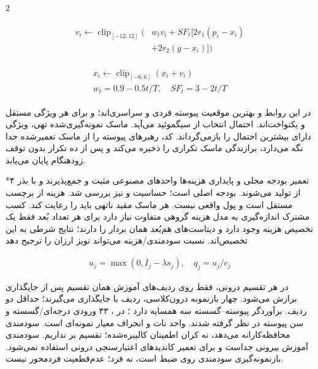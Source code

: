 \documentclass[10pt,a4paper]{article}
\makeatletter
\renewcommand{\section}{\@startsection{section}{1}{0pt}{5pt}{2pt}{\normalfont\normalsize\bfseries}}
\newcommand{\sect}[1]{\section*{#1}}
\makeatother
\begin{document}
\begin{multicols}{2}
\begin{latin}\begin{equation}\begin{gathered}\begin{aligned}v_i\leftarrow\operatorname{clip}_{[-12,12]}\big(&w_t v_i+SF_t[2r_1(p_i-x_i)\\&+2r_2(g-x_i)]\big)\end{aligned}\end{gathered}\end{equation}\end{latin}
\begin{latin}\begin{equation}\begin{gathered}\begin{gathered}x_i\leftarrow\operatorname{clip}_{[-6,6]}(x_i+v_i)\\w_t=0.9-0.5t/T,\quad SF_t=3-2t/T\end{gathered}\end{gathered}\end{equation}\end{latin}
در این روابط  و  بهترین موقعیت پیوسته فردی و سراسری‌اند؛  و  برای هر ویژگی مستقل و یکنواخت‌اند. احتمال انتخاب از سیگموئید  می‌آید. ماسک نمونه‌گیری‌شده تهی، ویژگی دارای بیشترین احتمال را بازمی‌گرداند. کد، رهبرهای پیوسته را از ماسک تعمیرشده جدا نگه می‌دارد، برازندگی ماسک تکراری را ذخیره می‌کند و پس از ده تکرار بدون توقف زودهنگام پایان می‌یابد.

\sect{۴  تعمیر بودجه محلی و پایداری}
هزینه‌ها واحدهای مصنوعی مثبت و جمع‌پذیرند و با بذر  از  تولید می‌شوند. بودجه اصلی  است؛ حساسیت  و  نیز بررسی شد. هزینه از برچسب مستقل است و پول واقعی نیست. هر ماسک مقید ناتهی باید  را رعایت کند. کسب مشترک اندازه‌گیری به مدل هزینه گروهی متفاوت نیاز دارد  برای هر تعداد بُعد فقط یک تخصیص هزینه وجود دارد و دیتاست‌های هم‌بُعد همان بردار را دارند؛ نتایج شرطی به این تخصیص‌اند. نسبت سودمندی/هزینه می‌تواند نویز ارزان را ترجیح دهد 

\begin{latin}\begin{equation}\begin{gathered}u_j=\max(0,\overline I_j-\lambda s_j),\quad q_j=u_j/c_j\end{gathered}\end{equation}\end{latin}
در هر تقسیم درونی،  فقط روی ردیف‌های آموزش همان تقسیم پس از جایگذاری برازش می‌شود. چهار بازنمونه درون‌کلاسی،  ردیف با جایگذاری می‌گیرند؛ حداقل دو ردیف. برآوردگر پیوسته–گسسته سه همسایه دارد \lr{[11]}؛ در ، ۳۳ ورودی درجه‌ای/گسسته و سن پیوسته در نظر گرفته شدند. واحد  نات و  انحراف معیار نمونه‌ای است.  سودمندی محافظه‌کارانه می‌دهد، نه کران اطمینان کالیبره‌شده؛ تقسیم بر  نداریم. سودمندی آموزش بیرونی جداست و برای تعمیر کاندیدهای اعتبارسنجی درونی استفاده نمی‌شود. بازنمونه‌گیری سودمندی  روی ضبط است، نه فرد؛  عدم‌قطعیت فردمحور نیست.


\end{multicols}
\end{document}
